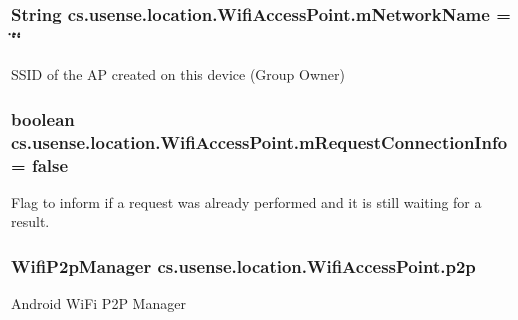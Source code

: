 \subsubsection[{m\+Network\+Name}]{\setlength{\rightskip}{0pt plus 5cm}String cs.\+usense.\+location.\+Wifi\+Access\+Point.\+m\+Network\+Name = \char`\"{}\char`\"{}\hspace{0.3cm}{\ttfamily [private]}}\label{classcs_1_1usense_1_1location_1_1_wifi_access_point_aa801040f056bb1bdc4a93e4feeaa8a74}
S\+S\+I\+D of the A\+P created on this device (Group Owner) \hypertarget{classcs_1_1usense_1_1location_1_1_wifi_access_point_a7206a0c3b5324062f6c2685f493904be}{}
\subsubsection[{m\+Request\+Connection\+Info}]{\setlength{\rightskip}{0pt plus 5cm}boolean cs.\+usense.\+location.\+Wifi\+Access\+Point.\+m\+Request\+Connection\+Info = false\hspace{0.3cm}{\ttfamily [private]}}\label{classcs_1_1usense_1_1location_1_1_wifi_access_point_a7206a0c3b5324062f6c2685f493904be}
Flag to inform if a request was already performed and it is still waiting for a result. \hypertarget{classcs_1_1usense_1_1location_1_1_wifi_access_point_ada5896bc8b9eef82a6c50fccfb26e90d}{}
\subsubsection[{p2p}]{\setlength{\rightskip}{0pt plus 5cm}Wifi\+P2p\+Manager cs.\+usense.\+location.\+Wifi\+Access\+Point.\+p2p\hspace{0.3cm}{\ttfamily [private]}}\label{classcs_1_1usense_1_1location_1_1_wifi_access_point_ada5896bc8b9eef82a6c50fccfb26e90d}
Android Wi\+Fi P2\+P Manager \hypertarget{classcs_1_1usense_1_1location_1_1_wifi_access_point_ac042464a16fe1ff488c047e496c1b7cc}{}
